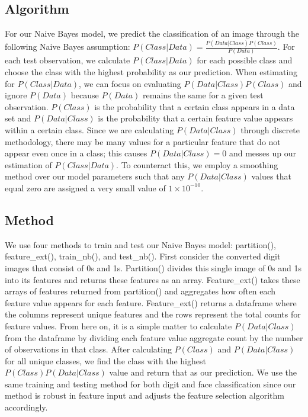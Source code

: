 \documentclass[10pt,parskip=half,
toc=sectionentrywithdots,
bibliography=totocnumbered,
captions=tableheading,numbers=noendperiod]{scrartcl}
\begin{document}
\hypertarget{algorithm}{%
\subsection{Algorithm}\label{algorithm}}

For our Naive Bayes model, we predict the classification of an image
through the following Naive Bayes assumption:
\(P(Class|Data) = \frac{P(Data|Class)P(Class)}{P(Data)}\). For each test
observation, we calculate \(P(Class|Data)\) for each possible class and
choose the class with the highest probability as our prediction. When
estimating for \(P(Class|Data)\), we can focus on evaluating
\(P(Data|Class)P(Class)\) and ignore \(P(Data)\) because \(P(Data)\)
remains the same for a given test observation. \(P(Class)\) is the
probability that a certain class appears in a data set and
\(P(Data|Class)\) is the probability that a certain feature value
appears within a certain class. Since we are calculating
\(P(Data|Class)\) through discrete methodology, there may be many values
for a particular feature that do not appear even once in a class; this
causes \(P(Data|Class) = 0\) and messes up our estimation of
\(P(Class|Data)\). To counteract this, we employ a smoothing method over
our model parameters such that any \(P(Data|Class)\) values that equal
zero are assigned a very small value of \(1 \times 10^{-10}\).

\hypertarget{method}{%
\subsection{Method}\label{method}}

We use four methods to train and test our Naive Bayes model:
partition(), feature\_ext(), train\_nb(), and test\_nb(). First consider
the converted digit images that consist of 0s and 1s. Partition()
divides this single image of 0s and 1s into its features and returns
these features as an array. Feature\_ext() takes these arrays of
features returned from partition() and aggregates how often each feature
value appears for each feature. Feature\_ext() returns a dataframe where
the columns represent unique features and the rows represent the total
counts for feature values. From here on, it is a simple matter to
calculate \(P(Data|Class)\) from the dataframe by dividing each feature
value aggregate count by the number of observations in that class. After
calculating \(P(Class)\) and \(P(Data|Class)\) for all unique classes,
we find the class with the highest \(P(Class)P(Data|Class)\) value and
return that as our prediction. We use the same training and testing
method for both digit and face classification since our method is robust
in feature input and adjusts the feature selection algorithm
accordingly.
\end{document}
